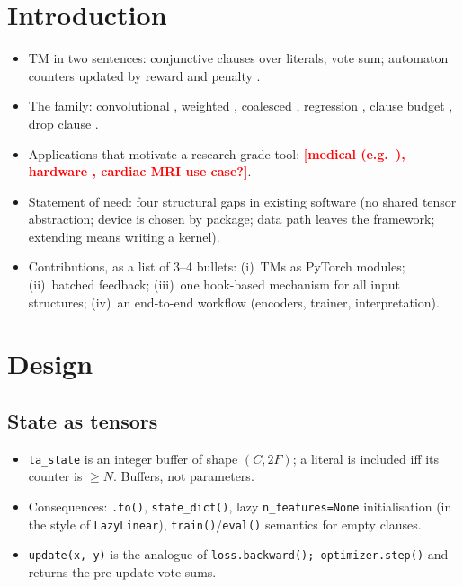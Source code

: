 \documentclass[twoside,11pt]{article}
\newcommand{\ph}[1]{\textcolor{red}{\textbf{[#1]}}}
\newenvironment{plan}{\begin{itemize}\color{gray}\small}{\end{itemize}}
\newcommand{\budget}[1]{\marginpar{\tiny\color{blue}#1}}
\newcommand{\code}[1]{\texttt{#1}}
\begin{document}
\section{Introduction}
\label{sec:intro}
\budget{$\approx$0.6 p}
\begin{plan}
  \item TM in two sentences: conjunctive clauses over literals; vote sum; automaton counters updated by reward and penalty \citep{granmo2018tsetlin,tsetlin1961}.
  \item The family: convolutional \citep{granmo2019convolutional}, weighted \citep{phoulady2019weighted}, coalesced \citep{glimsdal2021coalesced}, regression \citep{abeyrathna2020regression}, clause budget \citep{abeyrathna2023clausesize}, drop clause \citep{sharma2023dropclause}.
  \item Applications that motivate a research-grade tool: \ph{medical (e.g.\ \citealp{berge2018medical}), hardware \citep{wheeldon2020asynchronous}, cardiac MRI use case?}.
  \item Statement of need: four structural gaps in existing software (no shared tensor abstraction; device is chosen by package; data path leaves the framework; extending means writing a kernel).
  \item Contributions, as a list of 3--4 bullets: (i)~TMs as PyTorch modules; (ii)~batched feedback; (iii)~one hook-based mechanism for all input structures; (iv)~an end-to-end workflow (encoders, trainer, interpretation).
\end{plan}

\section{Design}
\label{sec:design}
\budget{$\approx$1.1 p}

\subsection{State as tensors}
\begin{plan}
  \item \code{ta\_state} is an integer buffer of shape $(C, 2F)$; a literal is included iff its counter is $\ge N$. Buffers, not parameters.
  \item Consequences: \code{.to()}, \code{state\_dict()}, lazy \code{n\_features=None} initialisation (in the style of \code{LazyLinear}), \code{train()}/\code{eval()} semantics for empty clauses.
  \item \code{update(x, y)} is the analogue of \code{loss.backward(); optimizer.step()} and returns the pre-update vote sums.
\end{plan}
\end{document}
